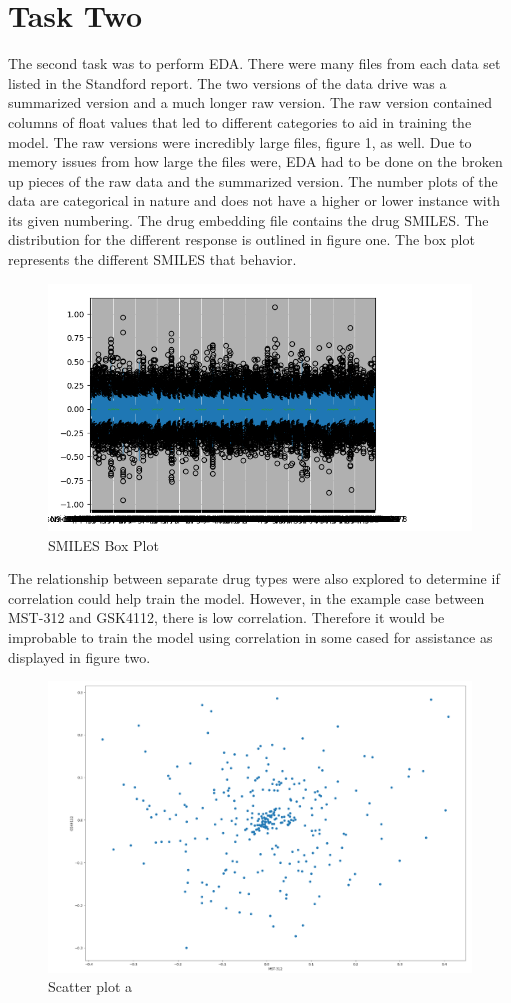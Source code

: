 \documentclass{article}
\begin{document}
\section{Task Two}
The second task was to perform EDA. There were many files from each data set listed in the Standford report. The two versions of the data drive was a summarized version and a much longer raw version. The raw version contained columns of float values that led to different categories to aid in training the model. The raw versions were incredibly large files, figure 1, as well. Due to memory issues from how large the files were, EDA had to be done on the broken up pieces of the raw data and the summarized version. The number plots of the data are categorical in nature and does not have a higher or lower instance with its given numbering. The drug embedding file contains the drug SMILES. The distribution for the different response is outlined in figure one. The box plot represents the different SMILES that behavior. 
\begin{figure}
    \centering
    \includegraphics[width=0.5\linewidth]{a.png}
    \caption{SMILES Box Plot}
    \label{fig:enter-label}
\end{figure}
The relationship between separate drug types were also explored to determine if correlation could help train the model. However, in the example case between MST-312 and GSK4112, there is low correlation. Therefore it would be improbable to train the model using correlation in some cased for assistance as displayed in figure two.
\begin{figure}
    \centering
    \includegraphics[width=0.5\linewidth]{b.png}
    \caption{Scatter plot a}
    \label{fig:enter-label}
\end{figure}
\end{document}
